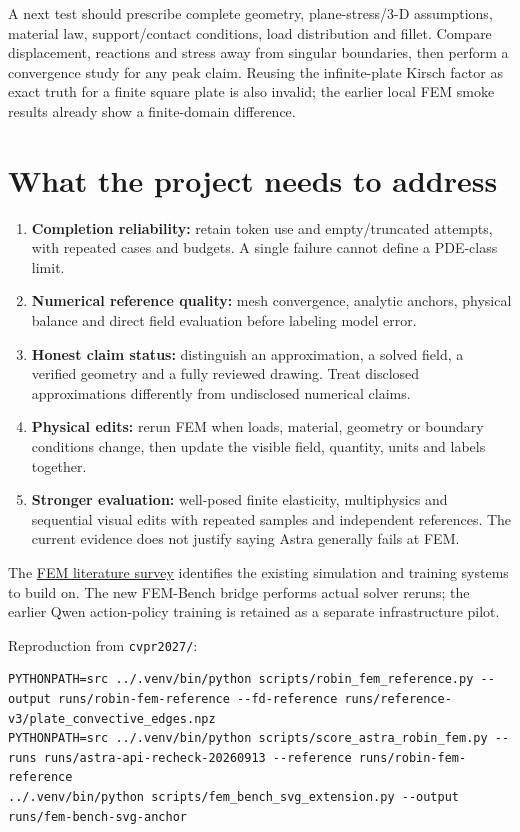 \documentclass[
  11pt,
  a4paper,
]{article}
\providecommand{\tightlist}{%
  \setlength{\itemsep}{0pt}\setlength{\parskip}{0pt}}
\begin{document}
A next test should prescribe complete geometry, plane-stress/3-D
assumptions, material law, support/contact conditions, load distribution
and fillet. Compare displacement, reactions and stress away from
singular boundaries, then perform a convergence study for any peak
claim. Reusing the infinite-plate Kirsch factor as exact truth for a
finite square plate is also invalid; the earlier local FEM smoke results
already show a finite-domain difference.

\section{What the project needs to
address}\label{what-the-project-needs-to-address}

\begin{enumerate}
\def\labelenumi{\arabic{enumi}.}
\tightlist
\item
  \textbf{Completion reliability:} retain token use and empty/truncated
  attempts, with repeated cases and budgets. A single failure cannot
  define a PDE-class limit.
\item
  \textbf{Numerical reference quality:} mesh convergence, analytic
  anchors, physical balance and direct field evaluation before labeling
  model error.
\item
  \textbf{Honest claim status:} distinguish an approximation, a solved
  field, a verified geometry and a fully reviewed drawing. Treat
  disclosed approximations differently from undisclosed numerical
  claims.
\item
  \textbf{Physical edits:} rerun FEM when loads, material, geometry or
  boundary conditions change, then update the visible field, quantity,
  units and labels together.
\item
  \textbf{Stronger evaluation:} well-posed finite elasticity,
  multiphysics and sequential visual edits with repeated samples and
  independent references. The current evidence does not justify saying
  Astra generally fails at FEM.
\end{enumerate}

The \href{../../reports/FEM_LITERATURE_AND_EXTENSION.md}{FEM literature
survey} identifies the existing simulation and training systems to build
on. The new FEM-Bench bridge performs actual solver reruns; the earlier
Qwen action-policy training is retained as a separate infrastructure
pilot.

Reproduction from \texttt{cvpr2027/}:

\begin{verbatim}
PYTHONPATH=src ../.venv/bin/python scripts/robin_fem_reference.py --output runs/robin-fem-reference --fd-reference runs/reference-v3/plate_convective_edges.npz
PYTHONPATH=src ../.venv/bin/python scripts/score_astra_robin_fem.py --runs runs/astra-api-recheck-20260913 --reference runs/robin-fem-reference
../.venv/bin/python scripts/fem_bench_svg_extension.py --output runs/fem-bench-svg-anchor
\end{verbatim}
\end{document}
